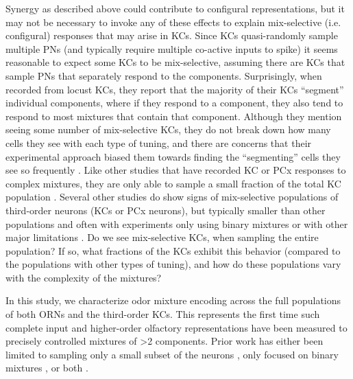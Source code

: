 \documentclass[12pt]{caltech_thesis}
\renewcommand{\cite}{{ }\autocite}
\begin{document}
\begin{refsection}
Synergy as described above could contribute to configural representations, but it may not be necessary to invoke any of these effects to explain mix-selective (i.e. configural) responses that may arise in KCs.
Since KCs quasi-randomly sample multiple PNs (and typically require multiple co-active inputs to spike) it seems reasonable to expect some KCs to be mix-selective, assuming there are KCs that sample PNs that separately respond to the components.
Surprisingly, when \textcite{LocustKCMixSpiking} recorded from locust KCs, they report that the majority of their KCs ``segment'' individual components, where if they respond to a component, they also tend to respond to most mixtures that contain that component.
Although they mention seeing some number of mix-selective KCs, they do not break down how many cells they see with each type of tuning, and there are concerns that their experimental approach biased them towards finding the ``segmenting'' cells they see so frequently\cite{LocustKCMixSpiking}.
Like other studies that have recorded KC or PCx responses to complex mixtures, they are only able to sample a small fraction of the total KC population\cite{PiriformMixSupp}.
Several other studies do show signs of mix-selective populations of third-order neurons (KCs or PCx neurons), but typically smaller than other populations and often with experiments only using binary mixtures or with other major limitations\cite{PiriformMixSupp,Rokni2020,Endo2020}.
Do we see mix-selective KCs, when sampling the entire population?
If so, what fractions of the KCs exhibit this behavior (compared to the populations with other types of tuning), and how do these populations vary with the complexity of the mixtures?

In this study, we characterize odor mixture encoding across the full populations of both ORNs and the third-order KCs.
This represents the first time such complete input and higher-order olfactory representations have been measured to precisely controlled mixtures of >2 components.
Prior work has either been limited to sampling only a small subset of the neurons\cite{LocustKCMixSpiking}, only focused on binary mixtures\cite{Endo2020}, or both\cite{PiriformMixSupp,Campbell2013}.


\end{refsection}
\end{document}
